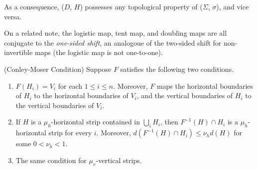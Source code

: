 \documentclass[12pt,twoside]{book}
\begin{document}
As a consequence, ($D$, $H$) possesses any topological property of ($\Sigma$, $\sigma$), and vice versa.

On a related note, the logistic map, tent map, and doubling maps are all conjugate to the \textit{one-sided shift}, an analogoue of the two-sided shift for non-invertible maps (the logistic map is not one-to-one).

\begin{theorem}
  (Conley-Moser Condition)
  Suppose $F$ satisfies the following two conditions.
  \begin{enumerate}
    \item $F(H_i) = V_i$ for each $1 \leq i \leq n$.
          Moreover, $F$ maps the horizontal boundaries of $H_i$ to the horizontal boundaries of $V_i$, and the vertical boundaries of $H_i$ to the vertical boundaries of $V_i$.
    \item If $H$ is a $\mu_h$-horizontal strip contained in $\bigcup_{i} H_i$, then $F^{-1}(H) \cap H_i$ is a $\mu_h$-horizontal strip for every $i$.
          Moreover, $d(F^{-1}(H) \cap H_i) \leq \nu_h d(H)$ for some $0 < \nu_h < 1$.
    \item The same condition for $\mu_v$-vertical strips.
  \end{enumerate}
  \label{thm:conley-moser}
\end{theorem}




\printindex
\end{document}
